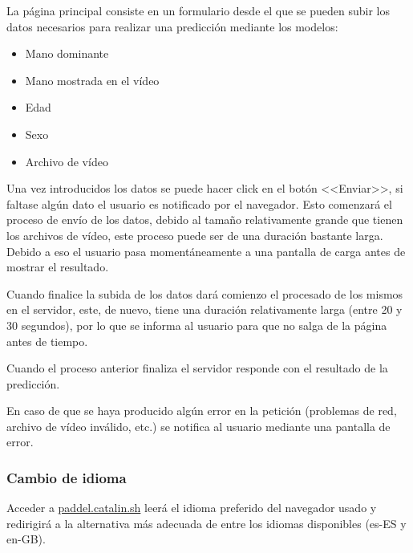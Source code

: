 La página principal consiste en un formulario desde el que se pueden subir los
datos necesarios para realizar una predicción mediante los modelos:

\begin{itemize}
    \item Mano dominante
    \item Mano mostrada en el vídeo
    \item Edad
    \item Sexo
    \item Archivo de vídeo
\end{itemize}


Una vez introducidos los datos se puede hacer click en el botón <<Enviar>>, si
faltase algún dato el usuario es notificado por el navegador. Esto comenzará el
proceso de envío de los datos, debido al tamaño relativamente grande que tienen
los archivos de vídeo, este proceso puede ser de una duración bastante larga.
Debido a eso el usuario pasa momentáneamente a una pantalla de carga antes de
mostrar el resultado.


Cuando finalice la subida de los datos dará comienzo el procesado de los mismos
en el servidor, este, de nuevo, tiene una duración relativamente larga (entre 20
y 30 segundos), por lo que se informa al usuario para que no salga de la página
antes de tiempo.


Cuando el proceso anterior finaliza el servidor responde con el resultado de la
predicción.


En caso de que se haya producido algún error en la petición (problemas de red,
archivo de vídeo inválido, etc.) se notifica al usuario mediante una pantalla de
error.


\subsubsection{Cambio de idioma}

Acceder a \href{https://paddle.catalin.sh}{paddel.catalin.sh} leerá el idioma
preferido del navegador usado y redirigirá a la alternativa más adecuada de
entre los idiomas disponibles (es-ES y en-GB).

